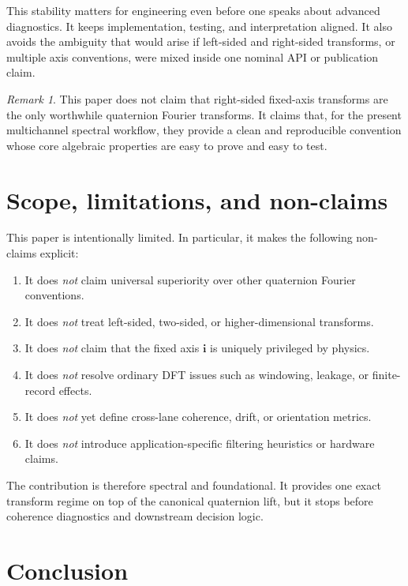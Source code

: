 \documentclass[11pt]{article}
\theoremstyle{remark}
\newtheorem{remark}[definition]{Remark}
\newcommand{\ii}{\mathbf{i}}
\begin{document}
This stability matters for engineering even before one speaks about advanced diagnostics. It keeps implementation, testing, and interpretation aligned. It also avoids the ambiguity that would arise if left-sided and right-sided transforms, or multiple axis conventions, were mixed inside one nominal API or publication claim.

\begin{remark}
This paper does not claim that right-sided fixed-axis transforms are the only worthwhile quaternion Fourier transforms. It claims that, for the present multichannel spectral workflow, they provide a clean and reproducible convention whose core algebraic properties are easy to prove and easy to test.
\end{remark}

\section{Scope, limitations, and non-claims}

This paper is intentionally limited. In particular, it makes the following non-claims explicit:
\begin{enumerate}[label=(\arabic*)]
    \item It does \emph{not} claim universal superiority over other quaternion Fourier conventions.
    \item It does \emph{not} treat left-sided, two-sided, or higher-dimensional transforms.
    \item It does \emph{not} claim that the fixed axis \(\ii\) is uniquely privileged by physics.
    \item It does \emph{not} resolve ordinary DFT issues such as windowing, leakage, or finite-record effects.
    \item It does \emph{not} yet define cross-lane coherence, drift, or orientation metrics.
    \item It does \emph{not} introduce application-specific filtering heuristics or hardware claims.
\end{enumerate}

The contribution is therefore spectral and foundational. It provides one exact transform regime on top of the canonical quaternion lift, but it stops before coherence diagnostics and downstream decision logic.

\section{Conclusion}
\end{document}
